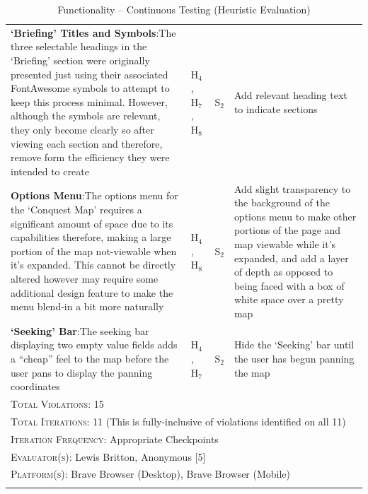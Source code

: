 \documentclass[11pt, english]{article}
\begin{document}
\begin{center}
\begin{longtable}{p{7.5cm}p{0.5cm}p{0.5cm}p{4cm}}
		\textbf{`Briefing' Titles and Symbols}:\newline The three selectable headings in the `Briefing' section were originally presented just using their associated FontAwesome symbols to attempt to keep this process minimal. However, although the symbols are relevant, they only become clearly so after viewing each section and therefore, remove form the efficiency they were intended to create & $\mathrm{H_{4}}$, $\mathrm{H_{7}}$, $\mathrm{H_{8}}$ & $\mathrm{S_{2}}$ & Add relevant heading text to indicate sections\\
		\textbf{Options Menu}:\newline The options menu for the `Conquest Map' requires a significant amount of space due to its capabilities therefore, making a large portion of the map not-viewable when it's expanded. This cannot be directly altered however may require some additional design feature to make the menu blend-in a bit more naturally & $\mathrm{H_{4}}$, $\mathrm{H_{8}}$ & $\mathrm{S_{2}}$ & Add slight transparency to the background of the options menu to make other portions of the page and map viewable while it's expanded, and add a layer of depth as opposed to being faced with a box of white space over a pretty map\\
		\textbf{`Seeking' Bar}:\newline The seeking bar displaying two empty value fields adds a ``cheap'' feel to the map before the user pans to display the panning coordinates & $\mathrm{H_{4}}$, $\mathrm{H_{7}}$ & $\mathrm{S_{2}}$ & Hide the `Seeking' bar until the user has begun panning the map\\
		\hline
                \multicolumn{4}{l}{\textsc{Total Violations}: 15}\\
                \multicolumn{4}{l}{\textsc{Total Iterations}: 11 (This is fully-inclusive of violations identified on all 11)}\\
		\multicolumn{4}{l}{\textsc{Iteration Frequency}: Appropriate Checkpoints}\\
		\multicolumn{4}{l}{\textsc{Evaluator(s)}: Lewis Britton, Anonymous [5]}\\
                \multicolumn{4}{l}{\textsc{Platform(s)}: Brave Browser (Desktop), Brave Browser (Mobile)}\\
                \hline
                \caption{Functionality -- Continuous Testing (Heuristic Evaluation)}
        \end{longtable}
        \end{center}
\end{document}
